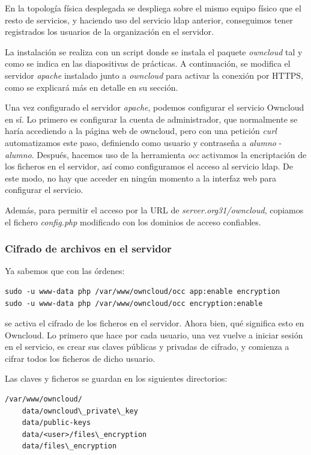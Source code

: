 \documentclass[]{article}
\begin{document}
En la topología física desplegada se despliega sobre el mismo equipo físico que el resto de servicios, y haciendo uso del servicio ldap anterior, conseguimos tener registrados los usuarios de la organización en el servidor.

La instalación se realiza con un script donde se instala el paquete \textit{owncloud} tal y como se indica en las diapositivas de prácticas. A continuación, se modifica el servidor \textit{apache} instalado junto a \textit{owncloud} para activar la conexión por HTTPS, como se explicará más en detalle en su sección.

Una vez configurado el servidor \textit{apache}, podemos configurar el servicio Owncloud en sí. Lo primero es configurar la cuenta de administrador, que normalmente se haría accediendo a la página web de owncloud, pero con una petición \textit{curl} automatizamos este paso, definiendo como usuario y contraseña a \textit{alumno} - \textit{alumno}. Después, hacemos uso de la herramienta \textit{occ} activamos la encriptación de los ficheros en el servidor, así como configuramos el acceso al servicio ldap. De este modo, no hay que acceder en ningún momento a la interfaz web para configurar el servicio.

Además, para permitir el acceso por la URL de \textit{server.org31/owncloud}, copiamos el fichero \textit{config.php} modificado con los dominios de acceso confiables.

\subsubsection{Cifrado de archivos en el servidor}

Ya sabemos que con las órdenes:
\begin{Verbatim}
sudo -u www-data php /var/www/owncloud/occ app:enable encryption
sudo -u www-data php /var/www/owncloud/occ encryption:enable
\end{Verbatim}

se activa el cifrado de los ficheros en el servidor. Ahora bien, qué significa esto en Owncloud. Lo primero que hace por cada usuario, una vez vuelve a iniciar sesión en el servicio, es crear sus claves públicas y privadas de cifrado, y comienza a cifrar todos los ficheros de dicho usuario.

Las claves y ficheros se guardan en los siguientes directorios:

\begin{Verbatim}
/var/www/owncloud/	
	data/owncloud\_private\_key
	data/public-keys
	data/<user>/files\_encryption
	data/files\_encryption 
\end{Verbatim}
\end{document}
